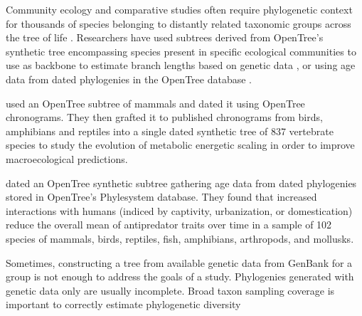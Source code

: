 \documentclass[oupdraft]{sysbio_sse}
\begin{document}
Community ecology and comparative studies often require phylogenetic context for thousands of
species belonging to distantly related taxonomic groups across the tree of life \citep{}.
Researchers have used subtrees derived from OpenTree's synthetic tree encompassing species present
in specific ecological communities to use as backbone to estimate branch lengths
based on genetic data \citep{allen2019spatial, smith2018constructing}, or using
age data from dated phylogenies in the OpenTree database \citep{uyeda2017evolution, geffroy2020evolutionary}.

\citep{uyeda2017evolution} used an OpenTree subtree of mammals and dated it using OpenTree
chronograms. They then grafted it to published chronograms from birds, amphibians
and reptiles into a single dated synthetic tree of 837 vertebrate species to study
the evolution of metabolic energetic scaling in order to improve macroecological predictions.

\citep{geffroy2020evolutionary} dated an OpenTree synthetic subtree gathering age data
from dated phylogenies stored in OpenTree's Phylesystem database. They found that
increased interactions with humans (indiced by captivity, urbanization, or domestication)
reduce the overall mean of antipredator traits over time in a sample of 102 species
of mammals, birds, reptiles, fish, amphibians, arthropods, and mollusks.



Sometimes, constructing a tree from available genetic data from GenBank for a group
is not enough to address the goals of a study.
Phylogenies generated with genetic data only are usually incomplete.
Broad taxon sampling coverage is important to correctly estimate phylogenetic
diversity \citep{jantzen2019effects, park2018taxon}
\end{document}
